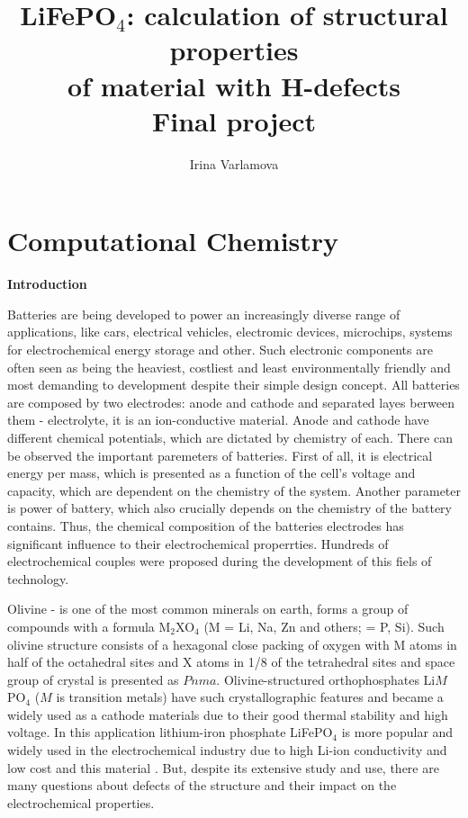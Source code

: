 \documentclass[11pt]{article}
\begin{document}
\title{ LiFePO$_4$: calculation of structural properties \\ of material with H-defects\\ 
\large Final project }
\author{Irina Varlamova}
\maketitle

\section{Computational Chemistry}
\noindent\mbox{\textbf{Introduction}}

Batteries are being developed to power an increasingly diverse range of applications, like cars, electrical vehicles, electromic devices, microchips, systems for electrochemical energy storage and other. Such electronic components are often seen as being the heaviest, costliest and least environmentally friendly and most demanding to development despite their simple design concept. All batteries are composed by two electrodes: anode and cathode and separated layes berween them - electrolyte, it is an ion-conductive material. Anode and cathode have different chemical potentials, which are dictated by chemistry of each. There can be observed the important paremeters of batteries. First of all, it is electrical energy per mass, which is presented as a function of the cell's voltage and capacity, which are dependent on the chemistry of the system. Another parameter is power of battery, which also crucially depends on the chemistry of the battery contains. Thus, the chemical composition of the batteries electrodes has significant influence to their electrochemical properrties. Hundreds of electrochemical couples were proposed during the development of this fiels of technology. 

Olivine - is one of the most common minerals on earth, forms a group of compounds with a formula M$_2$XO$_4$ (M = Li, Na, Zn and others;  = P, Si). Such olivine structure consists of a hexagonal close packing of oxygen with M atoms in half of the octahedral sites and X atoms in 1/8 of the tetrahedral sites and space group of crystal is presented as $Pnma$. Olivine-structured orthophosphates Li$M$PO$_4$ ($M$ is transition metals) have such crystallographic features and became a widely used as a cathode materials due to their good thermal stability and high voltage.  In this application lithium-iron phosphate LiFePO$_4$ is more popular and widely used in the electrochemical industry due to high Li-ion conductivity and low cost and this material \cite{LFP}. But, despite its extensive study and use, there are many questions about defects of the structure and their impact on the electrochemical properties.
\end{document}
